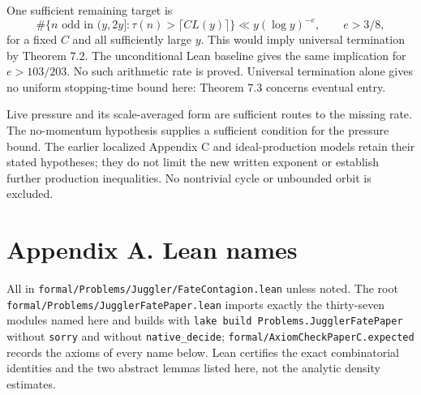 \documentclass[11pt,a4paper]{article}
\begin{document}
One sufficient remaining target is \[
\#\{n\text{ odd in }(y,2y]:\tau(n)>\lceil CL(y)\rceil\}
 \ll y(\log y)^{-e},\qquad e>3/8,
\] for a fixed \(C\) and all sufficiently large \(y\). This would imply
universal termination by Theorem 7.2. The unconditional Lean baseline
gives the same implication for \(e>103/203\). No such arithmetic rate is
proved. Universal termination alone gives no uniform stopping-time bound
here: Theorem 7.3 concerns eventual entry.

Live pressure and its scale-averaged form are sufficient routes to the
missing rate. The no-momentum hypothesis supplies a sufficient condition
for the pressure bound. The earlier localized Appendix C and
ideal-production models retain their stated hypotheses; they do not
limit the new written exponent or establish further production
inequalities. No nontrivial cycle or unbounded orbit is excluded.

\section{Appendix A. Lean names}\label{appendix-a.-lean-names}

All in \texttt{\nolinkurl{formal/Problems/Juggler/FateContagion.lean}}
unless noted. The root
\texttt{\nolinkurl{formal/Problems/JugglerFatePaper.lean}} imports
exactly the thirty-seven modules named here and builds with
\texttt{lake\ build\ Problems.JugglerFatePaper} without
\texttt{\nolinkurl{sorry}} and without
\texttt{\nolinkurl{native_decide}};
\texttt{\nolinkurl{formal/AxiomCheckPaperC.expected}} records the axioms
of every name below. Lean certifies the exact combinatorial identities
and the two abstract lemmas listed here, not the analytic density
estimates.

\begingroup\small
\end{document}
